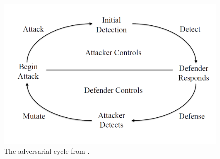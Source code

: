 \begin{figure}
	\centering
	\includegraphics[scale=0.4]{fig/fis-adv-cycle}
	\caption{The adversarial cycle from \cite{jan-fis}.}
	\label{jan-adv-cycle-fis}
\end{figure}
